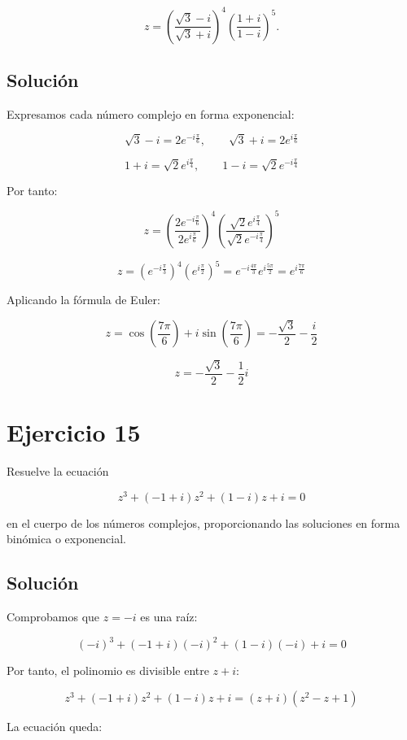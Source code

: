 \documentclass[fleqn]{article}
\begin{document}
		\[
		z=
		\left(
		\frac{\sqrt{3}-i}{\sqrt{3}+i}
		\right)^4
		\left(
		\frac{1+i}{1-i}
		\right)^5.
		\]

		\subsection{Solución}

		Expresamos cada número complejo en forma exponencial:

		\[
		\sqrt{3}-i=2e^{-i\frac{\pi}{6}},
		\qquad
		\sqrt{3}+i=2e^{i\frac{\pi}{6}}
		\]

		\[
		1+i=\sqrt{2}e^{i\frac{\pi}{4}},
		\qquad
		1-i=\sqrt{2}e^{-i\frac{\pi}{4}}
		\]

		Por tanto:

		\[
		z=
		\left(
		\frac{2e^{-i\frac{\pi}{6}}}{2e^{i\frac{\pi}{6}}}
		\right)^4
		\left(
		\frac{\sqrt{2}e^{i\frac{\pi}{4}}}
		{\sqrt{2}e^{-i\frac{\pi}{4}}}
		\right)^5
		\]

		\[
		z=
		\left(e^{-i\frac{\pi}{3}}\right)^4
		\left(e^{i\frac{\pi}{2}}\right)^5
		=
		e^{-i\frac{4\pi}{3}}e^{i\frac{5\pi}{2}}
		=
		e^{i\frac{7\pi}{6}}
		\]

		Aplicando la fórmula de Euler:

		\[
		z=
		\cos\left(\frac{7\pi}{6}\right)
		+i\sin\left(\frac{7\pi}{6}\right)
		=
		-\frac{\sqrt{3}}{2}-\frac{i}{2}
		\]

		\[
		\boxed{
		z=-\frac{\sqrt{3}}{2}-\frac{1}{2}i
		}
		\]

	\section{Ejercicio 15}
		Resuelve la ecuación

		\[
		z^3+(-1+i)z^2+(1-i)z+i=0
		\]

		en el cuerpo de los números complejos, proporcionando las soluciones en forma binómica o exponencial.

		\subsection{Solución}

		Comprobamos que $z=-i$ es una raíz:

		\[
		(-i)^3+(-1+i)(-i)^2+(1-i)(-i)+i=0
		\]

		Por tanto, el polinomio es divisible entre $z+i$:

		\[
		z^3+(-1+i)z^2+(1-i)z+i
		=
		(z+i)(z^2-z+1)
		\]

		La ecuación queda:
\end{document}
